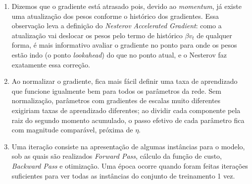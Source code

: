 \documentclass{dlproblemset}
\begin{document}
\begin{enumerate}[1)]
    \item Dizemos que o gradiente está atrasado pois, devido ao \textit{momentum}, já existe uma atualização dos pesos conforme o histórico dos gradientes. Essa observação leva a definição do \textit{Nesterov Accelerated Gradient}: como a atualização vai deslocar os pesos pelo termo de histórico $\beta v_t$ de qualquer forma, é mais informativo avaliar o gradiente no ponto para onde os pesos estão indo (o ponto \textit{lookahead}) do que no ponto atual, e o Nesterov faz exatamente essa correção.

    \item Ao normalizar o gradiente, fica mais fácil definir uma taxa de aprendizado que funcione igualmente bem para todos os parâmetros da rede. Sem normalização, parâmetros com gradientes de escalas muito diferentes exigiriam taxas de aprendizado diferentes; ao dividir cada componente pela raiz do segundo momento acumulado, o passo efetivo de cada parâmetro fica com magnitude comparável, próxima de $\eta$.

    \item Uma iteração consiste na apresentação de algumas instâncias para o modelo, sob as quais são realizados \textit{Forward Pass}, cálculo da função de custo, \textit{Backward Pass} e otimização. Uma época ocorre quando foram feitas iterações suficientes para ver todas as instâncias do conjunto de treinamento 1 vez.


\end{enumerate}
\end{document}
